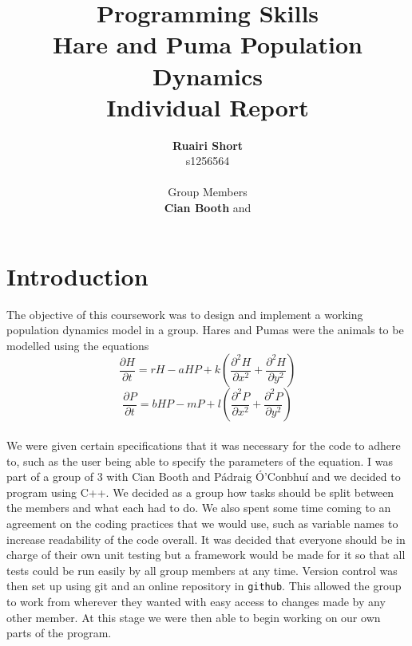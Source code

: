 \documentclass[12pt]{article}    %
\title{\textbf{Programming Skills}\\Hare and Puma Population Dynamics\\Individual Report}  %
\author{\textbf{Ruairi Short}\\s1256564\\\\Group Members\\\textbf{Cian Booth} and \textbf{\pa}}     %
\date{}   %
\numberwithin{equation}{section}
\newcommand{\pf}[2]{\frac{\partial{#1}}{\partial{#2}}}
\begin{document}

\maketitle                 %
\begin{center}

\clearpage
{}
\end{center}

\section{Introduction}
The objective of this coursework was to design and implement a working population dynamics model in a group.
Hares and Pumas were the animals to be modelled using the equations
\[\pf{H}{t}=rH-aHP+k\left(\frac{\partial^2H}{\partial x^2}+\frac{\partial^2H}{\partial y^2}\right)\]
\[\pf{P}{t}=bHP-mP+l\left(\frac{\partial^2P}{\partial x^2}+\frac{\partial^2P}{\partial y^2}\right)\]
\\
We were given certain specifications that it was necessary for the code to adhere to, such as the user being able to specify the parameters of the equation.
I was part of a group of 3 with Cian Booth and P\'{a}draig \'{O}'Conbhu\'{i} and we decided to program using C++.
We decided as a group how tasks should be split between the members and what each had to do.
We also spent some time coming to an agreement on the coding practices that we would use, such as variable names to increase readability of the code overall.
It was decided that everyone should be in charge of their own unit testing but a framework would be made for it so that all tests could be run easily by all group members at any time.
Version control was then set up using git and an online repository in \texttt{github}.
This allowed the group to work from wherever they wanted with easy access to changes made by any other member.
At this stage we were then able to begin working on our own parts of the program.
\end{document}
